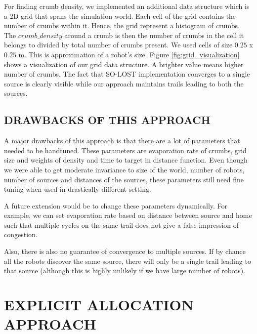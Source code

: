 \documentclass[letterpaper, 10 pt, conference]{ieeeconf}  %
\begin{document}
For finding crumb density, we implemented an additional data structure which is a 2D grid that spans the simulation world. Each cell of the grid contains the number of crumbs within it. Hence, the grid represent a histogram of crumbs. The $crumb\_density$ around a crumb is then the number of crumbs in the cell it belongs to divided by total number of crumbs present. We used cells of size $0.25$ x $ 0.25$  m. This is approximation of a robot's size. Figure \ref{fig:grid_visualization} shows a visualization of our grid data structure. A brighter value means higher number of crumbs. The fact that SO-LOST implementation converges to a single source is clearly visible while our approach maintains trails leading to both the sources.

\subsection{DRAWBACKS OF THIS APPROACH} \label{ssec:drawbacks_of_1}

A major drawbacks of this approach is that there are a lot of parameters that needed to be handtuned. These parameters are evaporation rate of crumbs, grid size and weights of density and time to target in distance function. Even though we were able to get moderate invariance to size of the world, number of robots, number of sources and distances of the sources, these parameters still need fine tuning when used in drastically different setting.

A future extension would be to change these parameters dynamically. For example, we can set evaporation rate based on distance between source and home such that multiple cycles on the same trail does not give a false impression of congestion.

Also, there is also no guarantee of convergence to multiple sources. If by chance all the robots discover the same source, there will only be a single trail leading to that source (although this is highly unlikely if we have large number of robots).

\section{EXPLICIT ALLOCATION APPROACH} 
\end{document}
